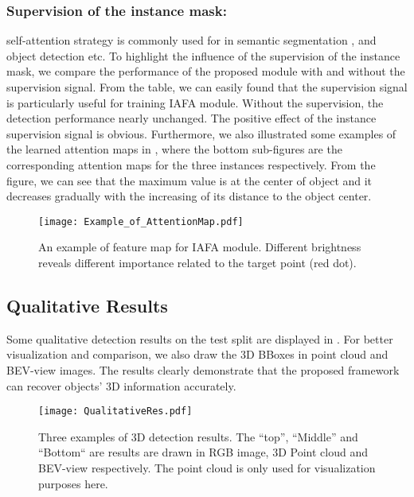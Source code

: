 \subsubsection{Supervision of the instance mask:} self-attention strategy is commonly used for in semantic segmentation \cite{liu2019deep}, \cite{fu2019dual} and object detection \cite{gu2018learning} etc. To highlight the influence of the supervision of the instance mask, we compare the performance of the proposed module with and without the supervision signal. From the table, we can easily found that the supervision signal is particularly useful for training IAFA module. Without the supervision, the detection performance nearly unchanged. The positive effect of the instance supervision signal is obvious. Furthermore, we also illustrated some examples of the learned attention maps in , where the bottom sub-figures are the corresponding attention maps for the three instances respectively. From the figure, we can see that the maximum value is at the center of object and it decreases gradually with the increasing of its distance to the object center. 
\begin{figure}[ht!]
 	\centering
 	\texttt{[image: Example\_of\_AttentionMap.pdf]}
 	\caption{An example of feature map for IAFA module. Different brightness reveals different importance related to the target point (red dot). }
 	\label{fig:Example_of_AttentionMap}
 \end{figure}
\subsection{Qualitative Results}
Some qualitative detection results on the test split are displayed in . For better visualization and comparison, we also draw the 3D BBoxes in point cloud and BEV-view images. The results clearly demonstrate that the proposed framework can recover objects' 3D information accurately. 
 \begin{figure}[ht!]
 	\centering
 	\texttt{[image: QualitativeRes.pdf]}
 	\caption{Three examples of 3D detection results. The ``top'', ``Middle'' and ``Bottom`` are results are drawn in RGB image, 3D Point cloud and BEV-view respectively. The point cloud is only used for visualization purposes here. }
 	\label{fig:qualitative_results_1}
 \end{figure}


%
